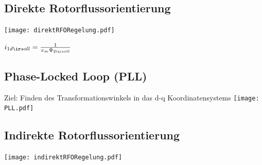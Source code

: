 \documentclass[german]{latex4ei_fs}
\begin{document}
\begin{sectionbox}

\subsection{Direkte Rotorflussorientierung} 

\texttt{[image: direktRFORegelung.pdf]}


$i_{1d \ir soll} = \frac{1}{x_{m} \Psi_{2\ir soll}}$
\end{sectionbox}

\begin{sectionbox}

\subsection{Phase-Locked Loop (PLL)} 

Ziel: Finden des Transformationswinkels in das d-q Koordinatensystems
\texttt{[image: PLL.pdf]}
\end{sectionbox}
\begin{sectionbox}

\subsection{Indirekte Rotorflussorientierung} 
\texttt{[image: indirektRFORegelung.pdf]}
\end{sectionbox}
\end{document}
